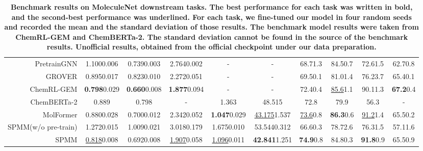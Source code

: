 \documentclass{nature_meth}
\newcommand{\1}{\blmath{1}}
\newcommand{\0}{\blmath{0}}
\begin{document}
\begin{table}[!hbt]
{\begin{tabular}{r|ccccc|lccc}
PretrainGNN\cite{pretraingnn}            & 1.1000.006         & 0.7390.003          & 2.7640.002      &-       &-           & \multicolumn{1}{c}{68.71.3} & 84.50.7         & 72.61.5    &62.70.8                    \\
GROVER\cite{grover}            & 0.8950.017       & 0.8230.010       & 2.2720.051      &-       &-          & \multicolumn{1}{c}{69.50.1} & 81.01.4          & 76.23.7  &65.40.1      \\
ChemRL-GEM\cite{chemrl_gem}            & \textbf{0.798}0.029     & \textbf{0.660}0.008     & \textbf{1.877}0.094       &-       &-         & \multicolumn{1}{c}{72.40.4} & \underline{85.6}1.1    & 90.11.3  & \textbf{67.2}0.4            \\
ChemBERTa-2\cite{chemberta2} & 0.889       & 0.798   &-      & 1.363       & 48.515    & \multicolumn{1}{c}{72.8} & 79.9      & 56.3   &-               \\
MolFormer\cite{molformer}            & 0.8800.028         & 0.7000.012          & 2.3420.052        & \textbf{1.047}0.029   & \underline{43.175}1.537        & \multicolumn{1}{c}{\underline{73.6}0.8} & \textbf{86.3}0.6            & \underline{91.2}1.4      & 65.50.2                     \\
\hline
SPMM(w/o pre-train)      & 1.2720.015           & 1.0090.021          & 3.0180.179        & 1.6750.010             & 53.5440.312           & \multicolumn{1}{c}{66.60.3} & 78.72.6      & 76.31.5   &57.11.6                     \\
SPMM         &  \underline{0.818}0.008     & 0.6920.008     & \underline{1.907}0.058       & \underline{1.096}0.011        & \textbf{42.841}1.251             & \multicolumn{1}{c}{\textbf{74.9}0.8} & 84.80.3      & \textbf{91.8}0.9       & 65.50.9        \\ \hline 
\end{tabular}}
\vspace*{-0.5cm}
\caption{\bf\footnotesize 
Benchmark results on MoleculeNet downstream tasks. The best performance for each task was written in bold, and the second-best performance was underlined. For each task, we fine-tuned our model in four random seeds and recorded the mean and the standard deviation of those results. The benchmark model results were taken from ChemRL-GEM and ChemBERTa-2. The standard deviation cannot be found in the source of the benchmark results. Unofficial results, obtained from the official checkpoint under our data preparation.}

	\label{table2}
\end{table}
\end{document}
